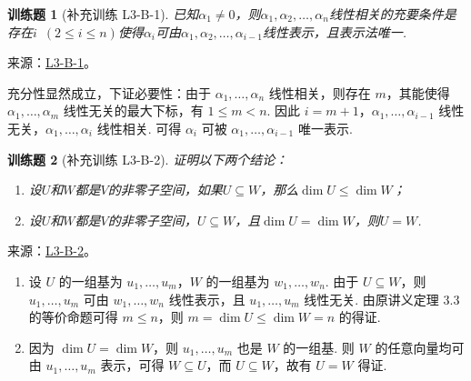 \documentclass[UTF8,12pt,a4paper,fontset=fandol]{ctexart}
\newtheorem{exercise}{训练题}[section]
\begin{document}
\begin{exercise}[补充训练 L3-B-1]\label{prob:L3-B-1}
已知$\alpha_1\neq 0$，则$\alpha_1,\alpha_2,\ldots,\alpha_n$线性相关的充要条件是存在$i\enspace(2 \leqslant i \leqslant n)$使得$\alpha_i$可由$\alpha_1,\alpha_2,\ldots,\alpha_{i-1}$线性表示，且表示法唯一.
\end{exercise}
\noindent 来源：\href{https://github.com/yhwu-is/Linear-Algebra-Left-Undone/blob/new/%E8%AE%B2%E4%B9%89/%E4%B8%93%E9%A2%98/3%20%E6%9C%89%E9%99%90%E7%BB%B4%E7%BA%BF%E6%80%A7%E7%A9%BA%E9%97%B4.tex}{L3-B-1}。
\begin{solve}
充分性显然成立，下证必要性：由于 $\alpha_1,\ldots,\alpha_n$ 线性相关，则存在 $m$，其能使得 $\alpha_1,\ldots,\alpha_m$ 线性无关的最大下标，有 $1\leqslant m<n$. 因此 $i=m+1$，$\alpha_1,\ldots,\alpha_{i-1}$ 线性无关，$\alpha_1,\ldots,\alpha_i$ 线性相关. 可得 $\alpha_i$ 可被 $\alpha_1,\ldots,\alpha_{i-1}$ 唯一表示.
\end{solve}

\begin{exercise}[补充训练 L3-B-2]\label{prob:L3-B-2}
证明以下两个结论：
        \begin{enumerate}
            \item 设$U$和$W$都是$V$的非零子空间，如果$U\subseteq W$，那么$\dim U \leqslant \dim W$；

            \item 设$U$和$W$都是$V$的非零子空间，$U\subseteq W$，且$\dim U = \dim W$，则$U = W$.
        \end{enumerate}
\end{exercise}
\noindent 来源：\href{https://github.com/yhwu-is/Linear-Algebra-Left-Undone/blob/new/%E8%AE%B2%E4%B9%89/%E4%B8%93%E9%A2%98/3%20%E6%9C%89%E9%99%90%E7%BB%B4%E7%BA%BF%E6%80%A7%E7%A9%BA%E9%97%B4.tex}{L3-B-2}。
\begin{solve}
\begin{enumerate}
                \item 设 $U$ 的一组基为 $u_1,\ldots,u_m$，$W$ 的一组基为 $w_1,\ldots,w_n$. 由于 $U\subseteq W$，则 $u_1,\ldots,u_m$ 可由 $w_1,\ldots,w_n$ 线性表示，且 $u_1,\ldots,u_m$ 线性无关. 由原讲义定理 3.3 的等价命题可得 $m\leqslant n$，则 $m=\dim U\leqslant\dim W=n$ 的得证.

                \item 因为 $\dim U=\dim W$，则 $u_1,\ldots,u_m$ 也是 $W$ 的一组基. 则 $W$ 的任意向量均可由 $u_1,\ldots,u_m$ 表示，可得 $W\subseteq U$，而 $U\subseteq W$，故有 $U=W$ 得证.
            \end{enumerate}
\end{solve}
\end{document}
